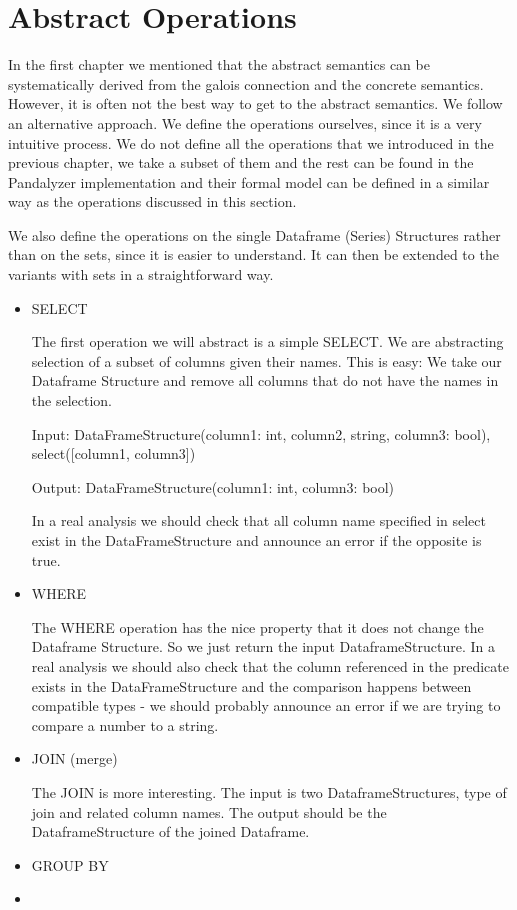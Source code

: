 \section{Abstract Operations}

In the first chapter we mentioned that the abstract semantics can be systematically derived from the galois connection
and the concrete semantics.
However, it is often not the best way to get to the abstract semantics.
We follow an alternative approach.
We define the operations ourselves, since it is a very intuitive process.
We do not define all the operations that we introduced in the previous chapter, we take a subset of them and
the rest can be found in the Pandalyzer implementation and their formal model can be defined in a similar way as the
operations discussed in this section.

We also define the operations on the single Dataframe (Series) Structures rather than on the sets, since it is
easier to understand.
It can then be extended to the variants with sets in a straightforward way.

\begin{itemize}
    \item SELECT

    The first operation we will abstract is a simple SELECT\@.
    We are abstracting selection of a subset of columns given their names.
    This is easy: We take our Dataframe Structure and remove all columns that do not have the names in the selection.
    \begin{example}

        Input: DataFrameStructure(column1: int, column2, string, column3: bool), select([column1, column3])

        Output: DataFrameStructure(column1: int, column3: bool)
    \end{example}
    In a real analysis we should check that all column name specified in select exist in the DataFrameStructure and
    announce an error if the opposite is true.

    \item WHERE

    The WHERE operation has the nice property that it does not change the Dataframe Structure.
    So we just return the input DataframeStructure.
    In a real analysis we should also check that the column referenced in the predicate exists in the DataFrameStructure
    and the comparison happens between compatible types - we should probably announce an error if we are trying to compare
    a number to a string.

    \item JOIN (merge)

    The JOIN is more interesting.
    The input is two DataframeStructures, type of join and related column names.
    The output should be the DataframeStructure of the joined Dataframe.

    \item GROUP BY 



    \item {}


\end{itemize}

